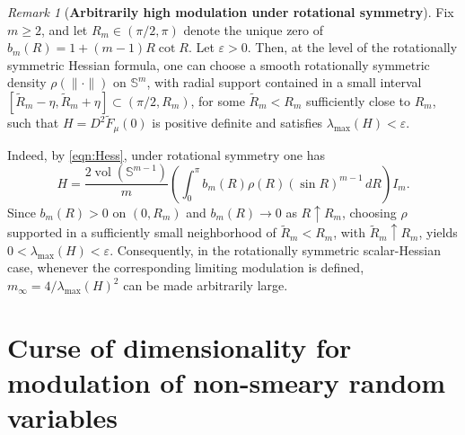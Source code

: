 \documentclass{amsart}
\theoremstyle{definition}
\theoremstyle{remark}
\newtheorem{remark}[theorem]{Remark}
\newcommand\0{\boldsymbol{0}}
\begin{document}
\begin{remark}[\textbf{Arbitrarily high modulation under rotational symmetry}]
\label{rem:arbitrary_modulation_fixed_m}
Fix \(m\ge2\), and let \(R_m\in(\pi/2,\pi)\) denote the unique zero of \(b_m(R)=1+(m-1)R\cot R\).  Let \(\varepsilon>0\).  Then, at the level of the rotationally symmetric Hessian formula, one can choose a smooth rotationally symmetric density \(\rho(\|\cdot\|)\) on \(\mathbb S^m\), with radial support contained in a small interval \([\widetilde R_m-\eta,\widetilde R_m+\eta]\subset(\pi/2,R_m)\), for some \(\widetilde R_m<R_m\) sufficiently close to \(R_m\), such that \(H=D^2\widetilde F_\mu(0)\) is positive definite and satisfies \(\lambda_{\max}(H)<\varepsilon\).

Indeed, by \eqref{eqn:Hess}, under rotational symmetry one has
\[
    H
    =
    \frac{2\operatorname{vol}(\mathbb S^{m-1})}{m}
    \left(
    \int_0^\pi
    b_m(R)\rho(R)(\sin R)^{m-1}\,dR
    \right)I_m.
\]
Since \(b_m(R)>0\) on \((0,R_m)\) and \(b_m(R)\to0\) as \(R\uparrow R_m\), choosing \(\rho\) supported in a sufficiently small neighborhood of \(\widetilde R_m<R_m\), with \(\widetilde R_m\uparrow R_m\), yields \(0<\lambda_{\max}(H)<\varepsilon\).  Consequently, in the rotationally symmetric scalar-Hessian case, whenever the corresponding limiting modulation is defined, \(m_\infty=4/\lambda_{\max}(H)^2\) can be made arbitrarily large.  
\end{remark}









\section{Curse of dimensionality for modulation of non-smeary random variables}
\label{scn:curse-dim-modulation}
\end{document}
